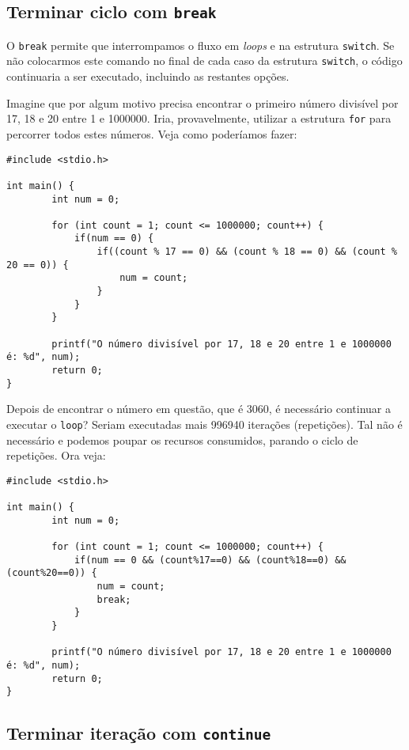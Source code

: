 \subsection{Terminar ciclo com \texttt{break}}

O \texttt{break} permite que interrompamos o fluxo em \textit{loops} e na estrutura \texttt{switch}. Se não colocarmos este comando no final de cada caso da estrutura \texttt{switch}, o código continuaria a ser executado, incluindo as restantes opções.

Imagine que por algum motivo precisa encontrar o primeiro número divisível por 17, 18 e 20 entre 1 e 1000000. Iria, provavelmente, utilizar a estrutura \texttt{for} para percorrer todos estes números. Veja como poderíamos fazer:

\begin{lstlisting}
#include <stdio.h>
 
int main() {      
		int num = 0;
           
        for (int count = 1; count <= 1000000; count++) {
            if(num == 0) {
                if((count % 17 == 0) && (count % 18 == 0) && (count % 20 == 0)) {
                    num = count;
                }
            }
        }
 
        printf("O número divisível por 17, 18 e 20 entre 1 e 1000000 é: %d", num);
        return 0;
}
\end{lstlisting}

Depois de encontrar o número em questão, que é 3060, é necessário continuar a executar o \texttt{loop}? Seriam executadas mais 996940 iterações (repetições). Tal não é necessário e podemos poupar os recursos consumidos, parando o ciclo de repetições. Ora veja:

\begin{lstlisting}
#include <stdio.h>
 
int main() {           
        int num = 0;
        
        for (int count = 1; count <= 1000000; count++) {
            if(num == 0 && (count%17==0) && (count%18==0) && (count%20==0)) {
                num = count;
                break;
            }
        }
 
        printf("O número divisível por 17, 18 e 20 entre 1 e 1000000 é: %d", num);
        return 0;
}
\end{lstlisting}

\subsection{Terminar iteração com \texttt{continue}}

